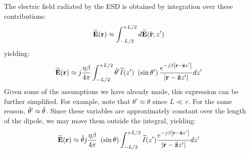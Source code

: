 The electric field radiated by the ESD is obtained by integration over these contributions:
%
\begin{equation}
\widetilde{\bf E}({\bf r}) \approx \int_{-L/2}^{+L/2} d\widetilde{\bf E}(\hat{\bf r};z') 
\end{equation}
%
yielding:
%
\begin{equation}
\widetilde{\bf E}({\bf r}) \approx 
 j \frac{\eta\beta}{4\pi} \int_{-L/2}^{+L/2} \hat{\bf \theta}' \widetilde{I}(z')~\left(\sin\theta'\right) \frac{e^{-j\beta \left|{\bf r}-\hat{\bf z}z'\right|}}{\left|{\bf r}-\hat{\bf z}z'\right|} dz'
\end{equation}
%
Given some of the assumptions we have already made, this expression can be further simplified.
For example, note that $\theta'\approx\theta$ since $L\ll r$.
For the same reason, $\hat{\bf \theta}'\approx\hat{\bf \theta}$.
Since these variables are approximately constant over the length of the dipole, we may move them outside the integral, yielding:
%
\begin{equation}
\widetilde{\bf E}({\bf r}) \approx \hat{\bf \theta} j \frac{\eta\beta}{4\pi}~\left(\sin\theta\right) \int_{-L/2}^{+L/2} \widetilde{I}(z') \frac{e^{-j\beta \left|{\bf r}-\hat{\bf z}z'\right|}}{\left|{\bf r}-\hat{\bf z}z'\right|} dz'
\label{m0198_eE1}
\end{equation}

